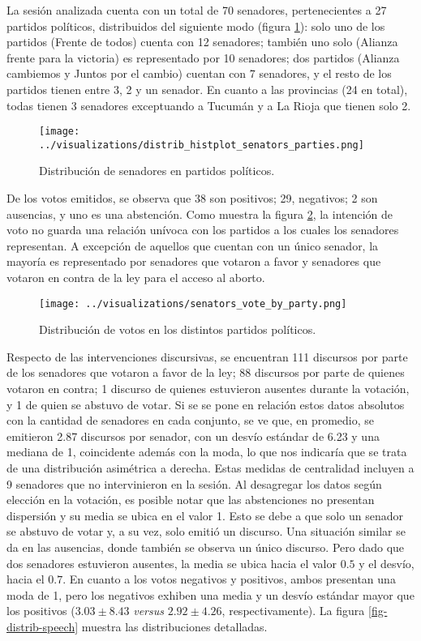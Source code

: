 La sesi\'on analizada cuenta con un total de 70 senadores,
pertenecientes a 27 partidos pol\'iticos, distribuidos del
siguiente modo (figura \ref{fig-distrib-senators}): 
solo uno de los partidos (Frente de todos) cuenta con 12
senadores; tambi\'en uno solo (Alianza frente para la victoria) es
representado por 10 senadores; dos partidos (Alianza cambiemos y
Juntos por el cambio) cuentan con 7 senadores, y el resto de los
partidos tienen entre 3, 2 y un senador.
En cuanto a las provincias (24 en total), todas tienen 3 senadores
exceptuando a Tucum\'an y a La Rioja que tienen solo 2.

\begin{figure}[h!]
\centering
\texttt{[image: ../visualizations/distrib\_histplot\_senators\_parties.png]}
\caption{Distribuci\'on de senadores en partidos pol\'iticos.}
\label{fig-distrib-senators}
\end{figure}

De los votos emitidos, se observa que 38 son positivos; 29, negativos;
2 son ausencias, y uno es una abstenci\'on.
Como muestra la figura \ref{fig-distrib-vote}, la intenci\'on
de voto no guarda una relaci\'on un\'ivoca con los partidos a los cuales los
senadores representan. A excepci\'on de aquellos que cuentan con un \'unico
senador, la mayor\'ia es representado por senadores que votaron a favor y senadores
que votaron en contra de la ley para el acceso al aborto.

\begin{figure}[h!]
\centering
\texttt{[image: ../visualizations/senators\_vote\_by\_party.png]}
\caption{Distribuci\'on de votos en los distintos partidos pol\'iticos.}
\label{fig-distrib-vote}
\end{figure}

Respecto de las intervenciones discursivas, se encuentran 111 discursos
por parte de los senadores que votaron a favor de la ley; 88 discursos por parte
de quienes votaron en contra; 1 discurso de quienes estuvieron ausentes
durante la votaci\'on, y 1 de quien se abstuvo de votar.
Si se se pone en relaci\'on estos datos absolutos con la cantidad de senadores en cada
conjunto, se ve que, en promedio, se emitieron
2.87 discursos por senador, con un desv\'io est\'andar de 6.23 y una mediana de 1,
coincidente adem\'as
con la moda, lo que nos indicar\'ia que se trata de una distribuci\'on asim\'etrica a derecha.
Estas medidas de centralidad incluyen a 9 senadores que no intervinieron en
la sesi\'on.
Al desagregar los datos seg\'un elecci\'on en la votaci\'on, es posible notar que las
abstenciones no presentan
dispersi\'on y su media se ubica en el valor 1. Esto se debe a que solo un senador
se abstuvo de votar y, a su vez, solo emiti\'o un discurso.
Una situaci\'on similar se da en las ausencias, donde tambi\'en se observa un \'unico discurso.
Pero dado que dos senadores estuvieron ausentes, la media se ubica hacia el valor $0.5$ y
el desv\'io, hacia el $0.7$.
En cuanto a los votos negativos y positivos, ambos presentan una moda de 1,
pero los negativos
exhiben una media y un desv\'io est\'andar mayor que los positivos
($3.03\pm8.43$ \textit{versus} $2.92\pm4.26$, respectivamente).
La figura \ref{fig-distrib-speech} muestra las distribuciones detalladas.

